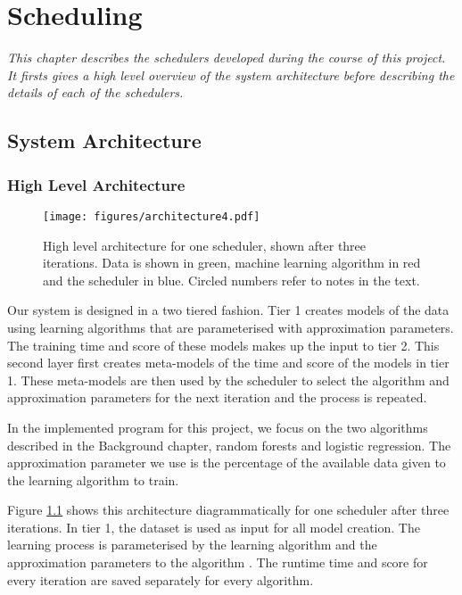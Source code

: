 \documentclass[a4paper,12pt,twoside,openright]{report}
\begin{document}


\chapter{Scheduling} 
\label{ch:scheduling}
\textit{This chapter describes the schedulers developed during the course of this project. It firsts gives a high level overview of the system architecture before describing the details of each of the schedulers.}

\section{System Architecture}

\subsection{High Level Architecture}
\begin{figure}[p]
    \centerline{\texttt{[image: figures/architecture4.pdf]}}
  \caption{High level architecture for one scheduler, shown after three iterations. Data is shown in green, machine learning algorithm in red and the scheduler in blue. Circled numbers refer to notes in the text.}
    \label{architecture}
\end{figure}


Our system is designed in a two tiered fashion. Tier 1 creates models of the data using learning algorithms that are parameterised with approximation parameters. The training time and score of these models makes up the input to tier 2. This second layer first creates meta-models of the time and score of the models in tier 1. These meta-models are then used by the scheduler to select the algorithm and approximation parameters for the next iteration and the process is repeated.

In the implemented program for this project, we focus on the two algorithms described in the Background chapter, random forests and logistic regression. The approximation parameter we use is the percentage of the available data given to the learning algorithm to train.

Figure \ref{architecture} shows this architecture diagrammatically for one scheduler after three iterations. In tier 1, the dataset \raisebox{.5pt}{\textcircled{\raisebox{-.9pt} {1}}} is used as input for all model creation. The learning process is parameterised by the learning algorithm and the approximation parameters to the algorithm \raisebox{.5pt}{\textcircled{\raisebox{-.9pt} {2}}}. The runtime time and score for every iteration are saved \raisebox{.5pt}{\textcircled{\raisebox{-.9pt} {3}}} separately for every algorithm.
\end{document}
